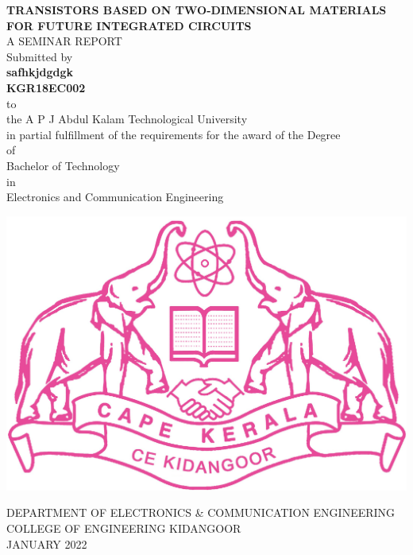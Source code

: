 \documentclass[12pt,a4paper]{report}
\begin{document}
\begin{center}
{\Large \textbf{TRANSISTORS BASED ON TWO-DIMENSIONAL MATERIALS
FOR FUTURE INTEGRATED CIRCUITS
}}\\
\vspace{2cm}
A SEMINAR REPORT\\
\vspace{0.5cm}
Submitted by \\
\vspace{1cm}
\textbf{safhkjdgdgk}\\
\vspace{0.2cm}
\textbf{KGR18EC002}\\
\vspace{0.2cm} to\\


 the A P J Abdul Kalam Technological University \\
in partial fulfillment of the requirements for the award 
of the Degree \\
of\\
Bachelor of Technology \\
in\\
Electronics and Communication Engineering
\end{center}


\begin{center}

\vspace{1.2cm}

\includegraphics[scale=0.3]{ceklogo.jpg}

DEPARTMENT OF ELECTRONICS \& COMMUNICATION ENGINEERING\\

COLLEGE OF ENGINEERING KIDANGOOR\\

JANUARY 2022\\
\end{center}
\end{document}
